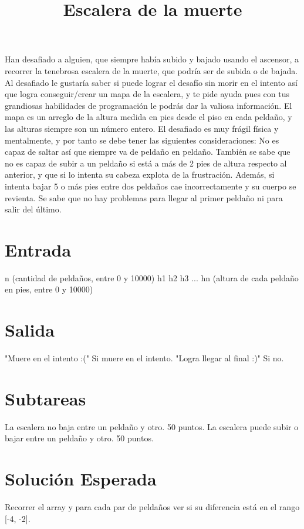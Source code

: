 \documentclass{article}
\title{Escalera de la muerte}
\begin{document}
\maketitle

Han desafiado a alguien, que siempre había subido y bajado usando el ascensor, a recorrer la tenebrosa escalera de la muerte, que podría ser de subida o de bajada.
Al desafiado le gustaría saber si puede lograr el desafío sin morir en el intento así que logra conseguir/crear un mapa de la escalera, y te pide ayuda pues con tus grandiosas habilidades de programación le podrás dar la valiosa información.
El mapa es un arreglo de la altura medida en pies desde el piso en cada peldaño, y las alturas siempre son un número entero.
El desafiado es muy frágil física y mentalmente, y por tanto se debe tener las siguientes consideraciones:
No es capaz de saltar así que siempre va de peldaño en peldaño.
También se sabe que no es capaz de subir a un peldaño si está a más de 2 pies de altura respecto al anterior, y que si lo intenta su cabeza explota de la frustración.
Además, si intenta bajar 5 o más pies entre dos peldaños cae incorrectamente y su cuerpo se revienta.
Se sabe que no hay problemas para llegar al primer peldaño ni para salir del último.

\section*{Entrada}
n (cantidad de peldaños, entre 0 y 10000)
h1 h2 h3 ... hn (altura de cada peldaño en pies, entre 0 y 10000)

\section*{Salida}
"Muere en el intento :(" Si muere en el intento.
"Logra llegar al final :)" Si no.

\section*{Subtareas}
La escalera no baja entre un peldaño y otro. 50 puntos.
La escalera puede subir o bajar entre un peldaño y otro. 50 puntos.


\section*{Solución Esperada}
Recorrer el array y para cada par de peldaños ver si su diferencia está en el rango [-4, -2].


 
\end{document}
